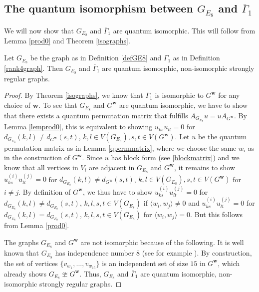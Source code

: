 \subsection[The quantum isomorphism]{The quantum isomorphism between \texorpdfstring{$G_{E_8}$}{G E8} and \texorpdfstring{$\overline{\Gamma}_1$}{the complement of Gamma 1}}

We will now show that $G_{E_8}$ and $\overline{\Gamma}_1$ are quantum isomorphic. This will follow from Lemma \ref{prod0} and Theorem \ref{isographs}.

\begin{theo}\label{qisostronglyregular}
Let $G_{E_8}$ be the graph as in Definition \ref{defGE8} and $\Gamma_1$ as in Definition \ref{rank4graph}. Then $G_{E_8}$ and $\overline{\Gamma}_1$ are quantum isomorphic, non-isomorphic strongly regular graphs.  
\end{theo}

\begin{proof}
By Theorem \ref{isographs}, we know that $\overline{\Gamma}_1$ is isomorphic to $G^{\boldsymbol{w}}$ for any choice of $\boldsymbol{w}$. To see that $G_{E_8}$ and $G^{\boldsymbol{w}}$ are quantum isomorphic, we have to show that there exists a quantum permutation matrix that fulfills $A_{G_{E_8}}u=uA_{G^{\boldsymbol{w}}}$. By Lemma \ref{lemprod0}, this is equivalent to showing $u_{ks}u_{lt}=0$ for $d_{G_{E_8}}(k,l)\neq d_{G^{\boldsymbol{w}}}(s,t)$, $k,l \in V(G_{E_8}), s,t \in V(G^{\boldsymbol{w}})$. Let $u$ be the quantum permutation matrix as in Lemma \ref{qpermmatrix}, where we choose the same $w_i$ as in the construction of $G^{\boldsymbol{w}}$. Since $u$ has block form (see \eqref{blockmatrix}) and we know that all vertices in $V_i$ are adjacent in $G_{E_8}$ and $G^{\boldsymbol{w}}$, it remains to show $u_{ks}^{(i)}u_{lt}^{(j)}=0$ for $d_{G_{E_8}}(k,l)\neq d_{G^{\boldsymbol{w}}}(s,t)$, $k,l \in V(G_{E_8}), s,t \in V(G^{\boldsymbol{w}})$ for $i \neq j$. By definition of $G^{\boldsymbol{w}}$, we thus have to show $u_{ks}^{(i)}u_{lt}^{(j)}=0$ for $d_{G_{E_8}}(k,l)\neq d_{G_{E_8}}(s,t)$, $k,l,s,t \in V(G_{E_8})$ if $\langle w_i,w_j \rangle \neq0$ and $u_{ks}^{(i)}u_{lt}^{(j)}=0$ for $d_{G_{E_8}}(k,l)= d_{G_{E_8}}(s,t)$, $k,l,s,t \in V(G_{E_8})$  for $\langle w_i,w_j \rangle =0$. But this follows from Lemma \ref{prod0}. 

The graphs $G_{E_8}$ and $G^{\boldsymbol{w}}$ are not isomorphic because of the following. It is well known that $G_{E_8}$ has independence number $8$ (see for example \cite[Section 10.39]{BVM}). By construction, the set of vertices $\{v_{w_1}, \dots, v_{w_{15}}\}$ is an independent set of size $15$ in $G^{\boldsymbol{w}}$, which already shows $G_{E_8}\ncong G^{\boldsymbol{w}}$. 
Thus, $G_{E_8}$ and $\overline{\Gamma}_1$ are quantum isomorphic, non-isomorphic strongly regular graphs.
\end{proof}

